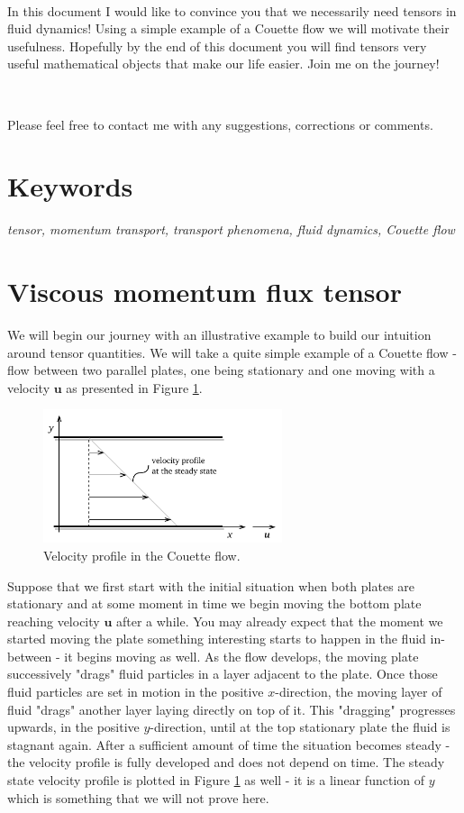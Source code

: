 \documentclass[10pt,twocolumn]{article}
\begin{document}
\,\,

In this document I would like to convince you that we necessarily need tensors in fluid dynamics! Using a simple example of a Couette flow we will motivate their usefulness. Hopefully by the end of this document you will find tensors very useful mathematical objects that make our life easier. Join me on the journey!

\,\,

Please feel free to contact me with any suggestions, corrections or comments.

\section*{Keywords}

\textit{tensor, momentum transport, transport phenomena, fluid dynamics, Couette flow}



\section*{Viscous momentum flux tensor}

We will begin our journey with an illustrative example to build our intuition around tensor quantities. We will take a quite simple example of a Couette flow - flow between two parallel plates, one being stationary and one moving with a velocity $\mathbf{u}$ as presented in Figure \ref{fig:couette-flow}.
\begin{figure}[H]
\centering\includegraphics[width=7cm]{couette-flow.pdf}
\caption{Velocity profile in the Couette flow.}
\label{fig:couette-flow}
\end{figure}
Suppose that we first start with the initial situation when both plates are stationary and at some moment in time we begin moving the bottom plate reaching velocity $\mathbf{u}$ after a while. You may already expect that the moment we started moving the plate something interesting starts to happen in the fluid in-between - it begins moving as well. As the flow develops, the moving plate successively "drags" fluid particles in a layer adjacent to the plate. Once those fluid particles are set in motion in the positive $x$-direction, the moving layer of fluid "drags" another layer laying directly on top of it. This "dragging" progresses upwards, in the positive $y$-direction, until at the top stationary plate the fluid is stagnant again. After a sufficient amount of time the situation becomes steady - the velocity profile is fully developed and does not depend on time. The steady state velocity profile is plotted in Figure \ref{fig:couette-flow} as well - it is a linear function of $y$ which is something that we will not prove here.
\end{document}
